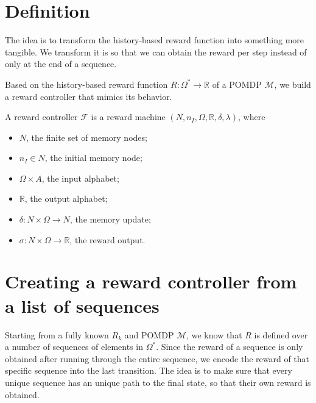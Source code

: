 \section{Definition}


The idea is to transform the history-based reward function into something more tangible. We transform it is so that we can obtain the reward per step instead of only at the end of a sequence.


Based on the history-based reward function $R:\Omega^*\to\mathbb{R}$ of a POMDP $\mathcal{M}$, we build a reward controller that mimics its behavior.



\begin{definition}
	A reward controller $\mathcal{F}$ is a reward machine $(N,n_I, \Omega, \mathbb{R}, \delta, \lambda)$, where
	\begin{itemize}
		\item $N$, the finite set of memory nodes;
		\item $n_I\in N$, the initial memory node;
		\item $\Omega\times A$, the input alphabet;
		\item $\mathbb{R}$, the output alphabet;
		\item $\delta: N \times \Omega \to N$, the memory update;
		\item $\sigma: N \times \Omega \to \mathbb{R}$, the reward output. 
	\end{itemize}
\end{definition}


\section{Creating a reward controller from a list of sequences}
Starting from a fully known $R_k$ and POMDP $\mathcal{M}$, we know that $R$ is defined over a number of sequences of elements in $\Omega^*$. Since the reward of a sequence is only obtained after running through the entire sequence, we encode the reward of that specific sequence into the last transition. The idea is to make sure that every unique sequence has an unique path to the final state, so that their own reward is obtained.


